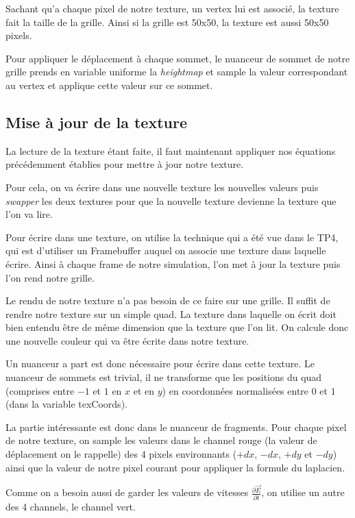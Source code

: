 \documentclass[a4paper,11pt,leqno]{article}
\begin{document}
Sachant qu'a chaque pixel de notre texture, un vertex lui est associé, la texture fait la taille de la grille. Ainsi si la grille est 50x50, la texture est aussi 50x50 pixels.

Pour appliquer le déplacement à chaque sommet, le nuanceur de sommet de notre grille prends en variable uniforme la \emph{heightmap} et sample la valeur correspondant au vertex et applique cette valeur sur ce sommet.

\subsection{Mise à jour de la texture}

La lecture de la texture étant faite, il faut maintenant appliquer nos équations précédemment établies pour mettre à jour notre texture.

Pour cela, on va écrire dans une nouvelle texture les nouvelles valeurs puis \emph{swapper} les deux textures pour que la nouvelle texture devienne la texture que l'on va lire.

Pour écrire dans une texture, on utilise la technique qui a été vue dans le TP4, qui est d'utiliser un Framebuffer auquel on associe une texture dans laquelle écrire. Ainsi à chaque frame de notre simulation, l'on met à jour la texture puis l'on rend notre grille.

Le rendu de notre texture n'a pas besoin de ce faire sur une grille. Il suffit de rendre notre texture sur un simple quad. La texture dans laquelle on écrit doit bien entendu être de même dimension que la texture que l'on lit. On calcule donc une nouvelle couleur qui va être écrite dans notre texture.

Un nuanceur a part est donc nécessaire pour écrire dans cette texture. Le nuanceur de sommets est trivial, il ne transforme que les positions du quad (comprises entre $-1$ et $1$ en $x$ et en $y$) en coordonnées normalisées entre $0$ et $1$ (dans la variable texCoords).

La partie intéressante est donc dans le nuanceur de fragments. Pour chaque pixel de notre texture, on sample les valeurs dans le channel rouge (la valeur de déplacement on le rappelle) des 4 pixels environnants ($+dx$, $-dx$, $+dy$ et $-dy$) ainsi que la valeur de notre pixel courant pour appliquer la formule du laplacien. 

Comme on a besoin aussi de garder les valeurs de vitesses $\frac{\partial \overrightarrow{E}}{\partial t}$, on utilise un autre des 4 channels, le channel vert.
\end{document}

